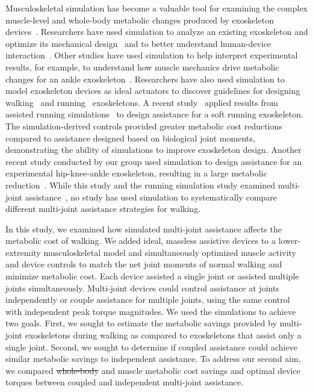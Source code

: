 \documentclass[10pt,letterpaper]{article}
\providecommand{\DIFaddtex}[1]{{\protect\color{blue}\uwave{#1}}} %
\providecommand{\DIFdeltex}[1]{{\protect\color{red}\sout{#1}}}                      %
\providecommand{\DIFaddbegin}{} %
\providecommand{\DIFaddend}{} %
\providecommand{\DIFdelbegin}{} %
\providecommand{\DIFdelend}{} %
\providecommand{\DIFadd}[1]{\texorpdfstring{\DIFaddtex{#1}}{#1}} %
\providecommand{\DIFdel}[1]{\texorpdfstring{\DIFdeltex{#1}}{}} %
\newcommand{\DIFscaledelfig}{0.5}
\newlength{\DIFdelgraphicswidth} %
\newlength{\DIFdelgraphicsheight} %
\newcommand{\DIFaddincludegraphics}[2][]{{\color{blue}\fbox{\DIFOincludegraphics[#1]{#2}}}} %
\newcommand{\DIFdelincludegraphics}[2][]{%
\sbox{\DIFdelgraphicsbox}{\DIFOincludegraphics[#1]{#2}}%
\settoboxwidth{\DIFdelgraphicswidth}{\DIFdelgraphicsbox} %
\settoboxtotalheight{\DIFdelgraphicsheight}{\DIFdelgraphicsbox} %
\scalebox{\DIFscaledelfig}{%
\parbox[b]{\DIFdelgraphicswidth}{\usebox{\DIFdelgraphicsbox}\\[-\baselineskip] \rule{\DIFdelgraphicswidth}{0em}}\llap{\resizebox{\DIFdelgraphicswidth}{\DIFdelgraphicsheight}{%
\setlength{\unitlength}{\DIFdelgraphicswidth}%
\begin{picture}(1,1)%
\thicklines\linethickness{2pt} %
{\color[rgb]{1,0,0}\put(0,0){\framebox(1,1){}}}%
{\color[rgb]{1,0,0}\put(0,0){\line( 1,1){1}}}%
{\color[rgb]{1,0,0}\put(0,1){\line(1,-1){1}}}%
\end{picture}%
}\hspace*{3pt}}} %
} %
\DeclareRobustCommand{\DIFaddbegin}{\DIFOaddbegin \let\includegraphics\DIFaddincludegraphics} %
\DeclareRobustCommand{\DIFaddend}{\DIFOaddend \let\includegraphics\DIFOincludegraphics} %
\DeclareRobustCommand{\DIFdelbegin}{\DIFOdelbegin \let\includegraphics\DIFdelincludegraphics} %
\DeclareRobustCommand{\DIFdelend}{\DIFOaddend \let\includegraphics\DIFOincludegraphics} %
\begin{document}
Musculoskeletal simulation has become a valuable tool for examining the complex muscle-level and whole-body metabolic changes produced by exoskeleton devices~\cite{Grabke:2019}. Researchers have used simulation to analyze an existing exoskeleton and optimize its mechanical design~\cite{Manns:2017} and to better understand human-device interaction~\cite{Fournier:2018}. Other studies have used simulation to help interpret experimental results, for example, to understand how muscle mechanics drive metabolic changes for an ankle exoskeleton~\cite{Jackson:2017}. Researchers have also used simulation to model exoskeleton devices as ideal actuators to discover guidelines for designing walking~\cite{Dembia:2017} and running~\cite{Uchida:2016} exoskeletons. A recent study~\cite{Lee:2017} applied results from assisted running simulations~\cite{Uchida:2016} to design assistance for a soft running exoskeleton. The simulation-derived controls provided greater metabolic cost reductions compared to assistance designed based on biological joint moments, demonstrating the ability of simulations to improve exoskeleton design. Another recent study conducted by our group used simulation to design assistance for an experimental hip-knee-ankle exoskeleton, resulting in a large metabolic reduction~\cite{Franks:2020}. While this study and the running simulation study examined multi-joint assistance~\cite{Uchida:2016}, no study has used simulation to systematically compare different multi-joint assistance strategies for walking.

In this study, we examined how simulated multi-joint assistance affects the metabolic cost of walking. We added ideal, massless assistive devices to a lower-extremity musculoskeletal model and simultaneously optimized muscle activity and device controls to match the net joint moments of normal walking and minimize metabolic cost. Each device assisted a single joint or assisted multiple joints simultaneously. Multi-joint devices could control assistance at joints independently or couple assistance for multiple joints, using the same control with independent peak torque magnitudes. We used the simulations to achieve two goals. First, we sought to estimate the metabolic savings provided by multi-joint exoskeletons during walking as compared to exoskeletons that assist only a single joint. Second, we sought to determine if coupled assistance could achieve similar metabolic savings \DIFaddbegin \DIFadd{compared }\DIFaddend to independent assistance. To address our second aim, we compared \DIFdelbegin \DIFdel{whole-body }\DIFdelend \DIFaddbegin \DIFadd{total }\DIFaddend and muscle metabolic cost savings and optimal device torques between coupled and independent multi-joint assistance.
\end{document}
